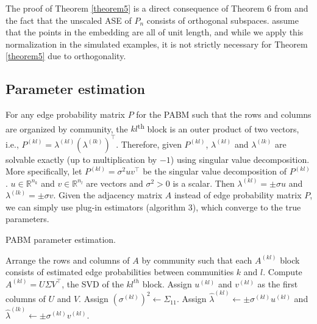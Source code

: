 \documentclass[12pt]{article}
\begin{document}
\begin{remark}
The proof of Theorem \ref{theorem5} is a direct consequence of Theorem 6 
from  \citeauthor{jmlr-v28-wang13} and the fact that the unscaled ASE of 
$P_n$ consists of orthogonal subspaces. \citeauthor{jmlr-v28-wang13} assume 
that the points in the embedding are all of unit length, and while we apply 
this normalization in the simulated examples, it is not strictly necessary 
for Theorem \ref{theorem5} due to orthogonality. 
\end{remark}

\hypertarget{parameter-estimation}{%
\subsection{Parameter estimation}\label{parameter-estimation}}

For any edge probability matrix \(P\) for the PABM such that the rows
and columns are organized by community, the \(kl\)\textsuperscript{th}
block is an outer product of two vectors, i.e.,
\(P^{(kl)} = \lambda^{(kl)} (\lambda^{(lk)})^\top\). Therefore, given
\(P^{(kl)}\), \(\lambda^{(kl)}\) and \(\lambda^{(lk)}\) are solvable
exactly (up to multiplication by \(-1\)) using singular value
decomposition. More specifically, let \(P^{(kl)} = \sigma^2 u v^\top\)
be the singular value decomposition of \(P^{(kl)}\).
\(u \in \mathbb{R}^{n_k}\) and \(v \in \mathbb{R}^{n_l}\) are vectors
and \(\sigma^2 > 0\) is a scalar. Then \(\lambda^{(kl)} = \pm \sigma u\)
and \(\lambda^{(lk)} = \pm \sigma v\). Given the adjacency matrix \(A\)
instead of edge probability matrix \(P\), we can simply use plug-in
estimators (algorithm 3), which converge to the true parameters.

\begin{algorithm}[t]
  \DontPrintSemicolon
  \SetAlgoLined
  \caption{PABM parameter estimation.}
  Arrange the rows and columns of $A$ by community such that each 
  $A^{(kl)}$ block consists of estimated edge probabilities between 
  communities $k$ and $l$.\;
   {
    Compute $A^{(kl)} = U \Sigma V^\top$, the SVD of the $kl^{th}$ 
    block.\;
    Assign $u^{(kl)}$ and $v^{(kl)}$ as the first columns of $U$ and $V$. 
    Assign $(\sigma^{(kl)})^2 \leftarrow \Sigma_{11}$.\;
    Assign $\hat{\lambda}^{(kl)} \leftarrow \pm \sigma^{(kl)} u^{(kl)}$ and 
    $\hat{\lambda}^{(lk)} \leftarrow \pm \sigma^{(kl)} v^{(kl)}$.
  }
\end{algorithm}
\end{document}
